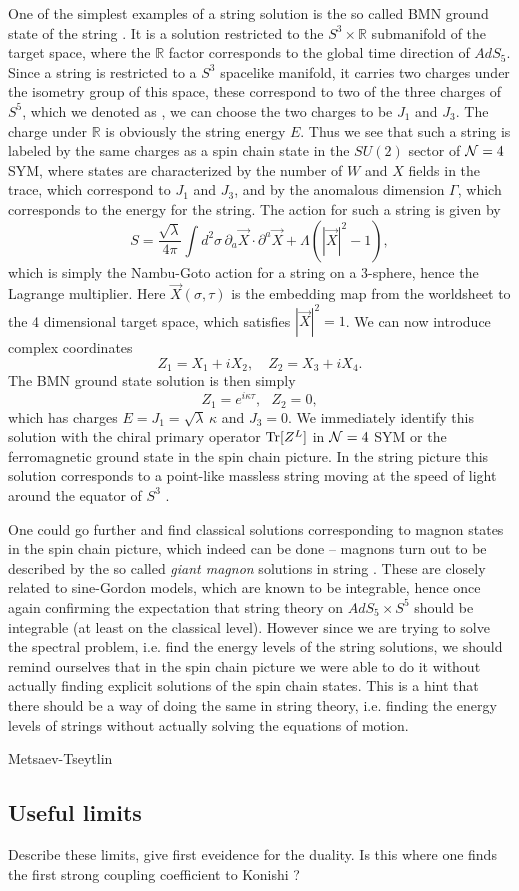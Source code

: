 One of the simplest examples of a string solution is the so called BMN ground state of the string \cite{dorey}. It is a solution restricted to the $S^3 \times \mathbb{R}$ submanifold of the target space, where the $\mathbb{R}$ factor corresponds to the global time direction of $AdS_5$. Since a string is restricted to a $S^3$ spacelike manifold, it carries two charges under the isometry group of this space, these correspond to two of the three charges of $S^5$, which we denoted as \text{[$J_1$, $J_2$, $J_3$]}, we can choose the two charges to be $J_1$ and $J_3$. The charge under $\mathbb{R}$ is obviously the string energy $E$. Thus we see that such a string is labeled by the same charges as a spin chain state in the $SU(2)$ sector of $\mathcal{N}=4$ SYM, where states are characterized by the number of $W$ and $X$ fields in the trace, which correspond to $J_1$ and $J_3$, and by the anomalous dimension $\Gamma$, which corresponds to the energy for the string. The action for such a string is given by
\begin{equation}
	S = \frac{\sqrt{\lambda}}{4 \pi} \int d^2 \sigma \, \partial_a \vec{X} \cdot \partial^a \vec{X} + \Lambda\left(  |\vec{X}|^2 - 1 \right),
\end{equation}
which is simply the Nambu-Goto action for a string on a 3-sphere, hence the Lagrange multiplier. Here $\vec{X}(\sigma, \tau)$ is the embedding map from the worldsheet to the 4 dimensional target space, which satisfies $|\vec{X}|^2 = 1$. We can now introduce complex coordinates
\begin{equation}
Z_1 = X_1 + iX_2, \,\,\,\,\,\, Z_2 = X_3 + iX_4.
\end{equation}
The BMN ground state solution is then simply
\begin{equation}
	Z_1 = e^{i \kappa \tau}, \,\,\,\, Z_2 = 0,
\end{equation}
which has charges $E = J_1 = \sqrt{\lambda} \, \kappa$ and $J_3 = 0$. We immediately identify this solution with the chiral primary operator $\mathrm{Tr} [Z^L]$ in $\mathcal{N}=4$ SYM or the ferromagnetic ground state in the spin chain picture. In the string picture this solution corresponds to a point-like massless string moving at the speed of light around the equator of $S^3$ \cite{dorey}. 

One could go further and find classical solutions corresponding to magnon states in the spin chain picture, which indeed can be done -- magnons turn out to be described by the so called \emph{giant magnon} solutions in string . These are closely related to sine-Gordon models, which are known to be integrable, hence once again confirming the expectation that string theory on $AdS_5 \times S^5$ should be integrable (at least on the classical level). However since we are trying to solve the spectral problem, i.e. find the energy levels of the string solutions, we should remind ourselves that in the spin chain picture we were able to do it without actually finding explicit solutions of the spin chain states. This is a hint that there should be a way of doing the same in string theory, i.e. finding the energy levels of strings without actually solving the equations of motion. 

Metsaev-Tseytlin

\subsection{Useful limits}

Describe these limits, give first eveidence for the duality. Is this where one finds the first strong coupling coefficient to Konishi ?